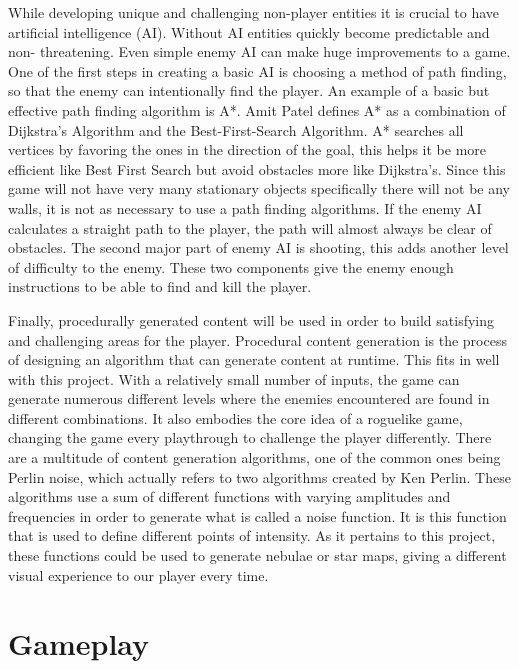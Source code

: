 \documentclass[12pt]{article}       %
\begin{document}
	While developing unique and challenging non-player entities it is crucial to have artificial intelligence (AI). Without AI entities quickly become predictable and non- threatening. Even simple enemy AI can make huge improvements to a game. One of the first steps in creating a basic AI is choosing a method of path finding, so that the enemy can intentionally find the player. An example of a basic but effective path finding algorithm is A*. Amit Patel defines A* as a combination of Dijkstra’s Algorithm and the Best-First-Search Algorithm. A* searches all vertices by favoring the ones in the direction of the goal, this helps it be more efficient like Best First Search but avoid obstacles more like Dijkstra’s. \cite{A} Since this game will not have very many stationary objects specifically there will not be any walls, it is not as necessary to use a path finding algorithms. If the enemy AI calculates a straight path to the player, the path will almost always be clear of obstacles.  The second major part of enemy AI is shooting, this adds another level of difficulty to the enemy. These two components give the enemy enough instructions to be able to find and kill the player. 

	Finally, procedurally generated content will be used in order to build satisfying and challenging areas for the player. Procedural content generation is the process of designing an algorithm that can generate content at runtime. This fits in well with this project. With a relatively small number of inputs, the game can generate numerous different levels where the enemies encountered are found in different combinations. It also embodies the core idea of a roguelike game, changing the game every playthrough to challenge the player differently. There are a multitude of content generation algorithms, one of the common ones being Perlin noise, which actually refers to two algorithms created by Ken Perlin. These algorithms use a sum of different functions with varying amplitudes and frequencies in order to generate what is called a noise function. It is this function that is used to define different points of intensity. As it pertains to this project, these functions could be used to generate nebulae or star maps, giving a different visual experience to our player every time. \cite{PCG}


\section{Gameplay} %
\label{sec:Gameplay}
\end{document}
